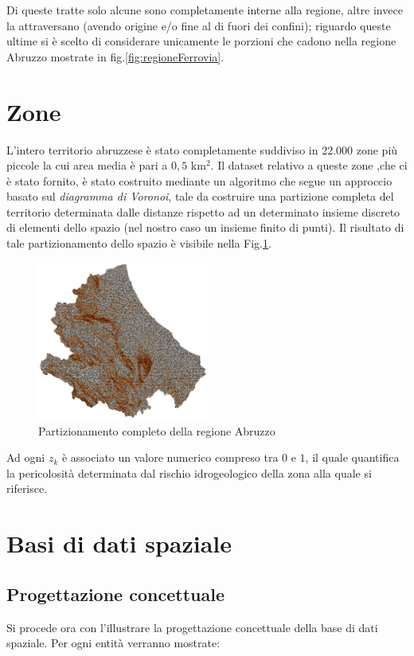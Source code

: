 Di queste tratte solo alcune sono completamente interne alla regione, altre invece la attraversano (avendo origine e/o fine al di fuori dei confini); riguardo queste ultime si è scelto di considerare unicamente le porzioni che cadono nella regione Abruzzo mostrate in fig.\ref{fig:regioneFerrovia}.
\newpage

\section{Zone}
\label{zone}
L'intero territorio abruzzese è stato completamente suddiviso in 22.000 zone più piccole la cui area media è pari a $0,5$ km$^2$. Il dataset relativo a queste zone ,che ci è stato fornito, è stato costruito mediante un algoritmo che segue un approccio basato sul \textit{diagramma di Voronoi}, tale da costruire una partizione completa del territorio determinata dalle distanze rispetto ad un determinato insieme discreto di elementi dello spazio (nel nostro caso un insieme finito di punti). Il risultato di tale partizionamento dello spazio è visibile nella Fig.\ref{fig:dataset}.
\begin{figure}[h]
	\centering
	\includegraphics[width=0.5\textwidth]{img/dataset}
	\caption{Partizionamento completo della regione Abruzzo}
    \label{fig:dataset}
\end{figure}

Ad ogni $z_k$ è associato un valore numerico compreso tra $0$ e $1$, il quale quantifica la pericolosità determinata dal rischio idrogeologico della zona alla quale si riferisce.


\section{Basi di dati spaziale}
\subsection{Progettazione concettuale}
Si procede ora con l’illustrare la progettazione concettuale della base di dati spaziale. Per ogni entità verranno mostrate:

